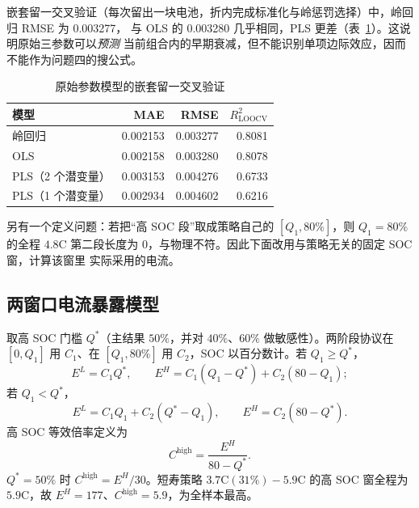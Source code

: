 嵌套留一交叉验证（每次留出一块电池，折内完成标准化与岭惩罚选择）中，岭回归 RMSE 为 0.003277，
与 OLS 的 0.003280 几乎相同，PLS 更差（表~\ref{tab:q2-loocv}）。这说明原始三参数可以\emph{预测}
当前组合内的早期衰减，但不能识别单项边际效应，因而不能作为问题四的搜公式。

\begin{table}[htbp]
\centering
\caption{原始参数模型的嵌套留一交叉验证}
\label{tab:q2-loocv}
\small
\begin{tabular}{lrrr}
\toprule
模型 & MAE & RMSE & \(R^2_{\mathrm{LOOCV}}\) \\
\midrule
岭回归 & 0.002153 & 0.003277 & 0.8081 \\
OLS & 0.002158 & 0.003280 & 0.8078 \\
PLS（2 个潜变量） & 0.003153 & 0.004276 & 0.6733 \\
PLS（1 个潜变量） & 0.002934 & 0.004602 & 0.6216 \\
\bottomrule
\end{tabular}
\end{table}

另有一个定义问题：若把“高 SOC 段”取成策略自己的 \([Q_1,80\%]\)，则 \(Q_1=80\%\) 的全程
\(4.8\mathrm{C}\) 第二段长度为 0，与物理不符。因此下面改用与策略无关的固定 SOC 窗，计算该窗里
实际采用的电流。

\subsection{两窗口电流暴露模型}

取高 SOC 门槛 \(Q^\ast\)（主结果 \(50\%\)，并对 \(40\%\)、\(60\%\) 做敏感性）。两阶段协议在
\([0,Q_1]\) 用 \(C_1\)、在 \([Q_1,80\%]\) 用 \(C_2\)，SOC 以百分数计。若 \(Q_1\ge Q^\ast\)，
\begin{equation}
E^{L}=C_1 Q^\ast,\qquad
E^{H}=C_1(Q_1-Q^\ast)+C_2(80-Q_1);
\label{eq:q2-exposure-hi}
\end{equation}
若 \(Q_1<Q^\ast\)，
\begin{equation}
E^{L}=C_1 Q_1+C_2(Q^\ast-Q_1),\qquad
E^{H}=C_2(80-Q^\ast).
\label{eq:q2-exposure-lo}
\end{equation}
高 SOC 等效倍率定义为
\begin{equation}
C^{\mathrm{high}}=\frac{E^{H}}{80-Q^\ast}.
\label{eq:q2-chigh}
\end{equation}
\(Q^\ast=50\%\) 时 \(C^{\mathrm{high}}=E^{H}/30\)。短寿策略 \(3.7\mathrm{C}(31\%)-5.9\mathrm{C}\)
的高 SOC 窗全程为 \(5.9\mathrm{C}\)，故 \(E^{H}=177\)、\(C^{\mathrm{high}}=5.9\)，为全样本最高。

